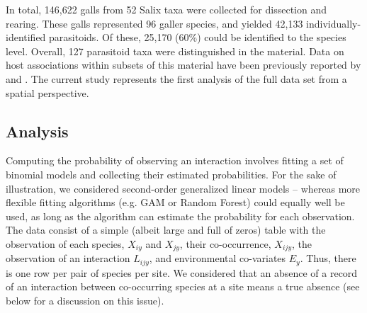 \documentclass[12pt]{article}
\begin{document}
In total, 146,622 galls from 52 Salix taxa were collected for dissection and
rearing. These galls represented 96 galler species, and yielded 42,133
individually-identified parasitoids. Of these, 25,170 (60\%) could be
identified to the species level. Overall, 127 parasitoid taxa were
distinguished in the material. Data on host associations within subsets of
this material have been previously reported by \citep{Kopelke1999} and
\citep{Nyman2007}. The current study represents the first analysis of
the full data set from a spatial perspective.

\subsection*{Analysis}

Computing the probability of observing an interaction involves fitting a set
of binomial models and collecting their estimated probabilities. For the sake
of illustration, we considered second-order generalized linear models –
whereas more flexible fitting algorithms (e.g. GAM or Random Forest)
could equally well be used, as long as the algorithm can estimate the
probability for each observation. The data consist of a simple (albeit large
and full of zeros) table with the observation of each species, $X_{iy}$ and $X_{jy}$,
their co-occurrence, $X_{ijy}$, the observation of an interaction $L_{ijy}$, and
environmental co-variates $E_y$. Thus, there is one row per pair of species per
site. We considered that an absence of a record of an interaction between co-occurring
species at a site means a true absence (see below for a discussion
on this issue).
\end{document}
